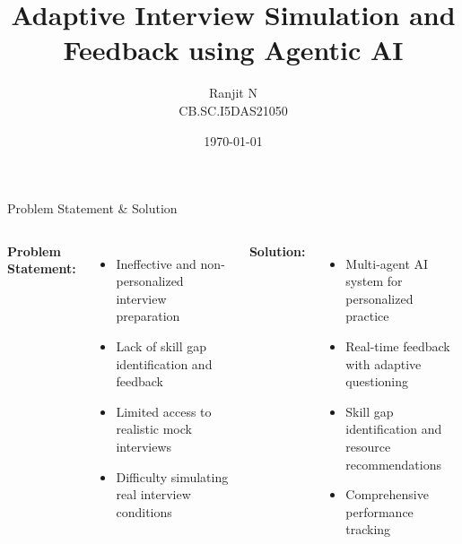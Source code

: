 \documentclass{beamer}
\title{Adaptive Interview Simulation and Feedback using Agentic AI}
\author{Ranjit N\\ CB.SC.I5DAS21050}
\institute{[Amrita Vishwa Vidyapeetham]}
\date{\today}
\begin{document}
\begin{frame}
    \titlepage
\end{frame}

\begin{frame}{Problem Statement \& Solution}
    \begin{columns}[T,onlytextwidth]
        \textbf{Problem Statement:}
        \begin{itemize}
            \item Ineffective and non-personalized interview preparation
            \item Lack of skill gap identification and feedback
            \item Limited access to realistic mock interviews
            \item Difficulty simulating real interview conditions
        \end{itemize}
        
        \textbf{Solution:}
        \begin{itemize}
            \item Multi-agent AI system for personalized practice
            \item Real-time feedback with adaptive questioning
            \item Skill gap identification and resource recommendations
            \item Comprehensive performance tracking
        \end{itemize}
    \end{columns}
\end{frame}
\end{document}
